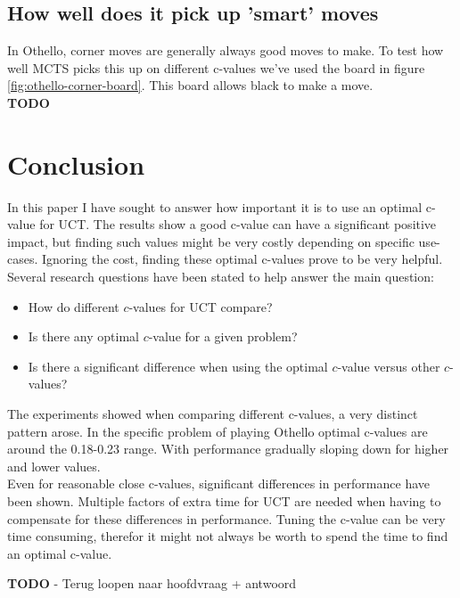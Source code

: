 \documentclass[
11pt, %
english, %
singlespacing, %
headsepline, %
]{MastersDoctoralThesis} %
\begin{document}
\section{How well does it pick up 'smart' moves}
In Othello, corner moves are generally always good moves to make. To test how well MCTS picks this up on different c-values we've used the board in figure \ref{fig:othello-corner-board}. This board allows black to make a move.\\
\textbf{TODO}

\chapter{Conclusion}
In this paper I have sought to answer how important it is to use an optimal c-value for UCT. The results show a good c-value can have a significant positive impact, but finding such values might be very costly depending on specific use-cases. Ignoring the cost, finding these optimal c-values prove to be very helpful.\\

Several research questions have been stated to help answer the main question:
\begin{itemize}
	\setlength\itemsep{0em}
	\item How do different $c$-values for UCT compare?
	\item Is there any optimal $c$-value for a given problem?
	\item Is there a significant difference when using the optimal $c$-value versus other $c$-values?
\end{itemize}

The experiments showed when comparing different c-values, a very distinct pattern arose. In the specific problem of playing Othello optimal c-values are around the 0.18-0.23 range. With performance gradually sloping down for higher and lower values.\\
Even for reasonable close c-values, significant differences in performance have been shown. Multiple factors of extra time for UCT are needed when having to compensate for these differences in performance. Tuning the c-value can be very time consuming, therefor it might not always be worth to spend the time to find an optimal c-value. 


\textbf{TODO }- Terug loopen naar hoofdvraag + antwoord





\printbibliography
\end{document}
